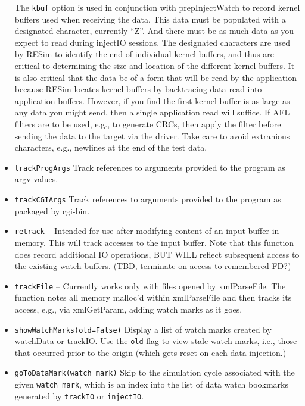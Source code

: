 \documentclass[titlepage]{article}
\begin{document}
\begin{itemize}
The {\tt kbuf} option is used in conjunction with prepInjectWatch to record kernel buffers used when receiving the data.  This data must be populated with 
a designated character, currently ``Z''.  And there must be as much data as you expect to read during injectIO sessions.  The designated characters are used by
RESim to identify the end of individual kernel buffers, and thus are critical to determining the size and location of the different kernel buffers.  It is also
critical that the data be of a form that will be read by the application because RESim locates kernel buffers by backtracing data read into application buffers.
However, if you find the first kernel buffer is as large as any data you might send, then a single application read will suffice.
If AFL filters are to be used, e.g., to generate CRCs, then apply the filter before sending the data to the target via the driver.
Take care to avoid extranious characters, e.g., newlines at the end of the test data.

\item {\tt trackProgArgs} Track references to arguments provided to the program as argv values.

\item {\tt trackCGIArgs} Track references to arguments provided to the program as packaged by cgi-bin.

\item {\tt retrack} -- Intended for use after modifying content of an input buffer in memory.  This will track accesses to the input buffer.
Note that this function does record additional IO operations, BUT WILL reflect subsequent access to the existing watch buffers.  (TBD, terminate on access
to remembered FD?)

\item {\tt trackFile} -- Currently works only with files opened by xmlParseFile. The function notes all memory malloc'd within
xmlParseFile and then tracks its access, e.g., via xmlGetParam, adding watch marks as it goes.

\item {\tt showWatchMarks(old=False)} Display a list of watch marks created by watchData or trackIO.  Use the {\tt old} flag to view stale watch marks, i.e., 
those that occurred prior to the origin (which gets reset on each data injection.)

\item {\tt goToDataMark(watch\_mark)}  Skip to the simulation cycle associated with the given {\tt watch\_mark}, which is an index into the list of data watch bookmarks generated by {\tt trackIO} or {\tt injectIO}.


\end{itemize}
\end{document}
